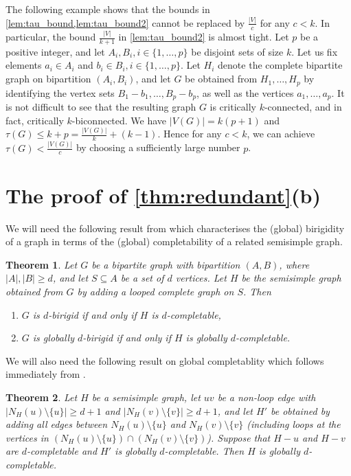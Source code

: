 \documentclass[11pt,a4paper,dvipsnames]{scrartcl}
\newtheorem{theorem}{Theorem}[section]
\begin{document}
The following example shows that the bounds in \cref{lem:tau_bound,lem:tau_bound2} cannot be replaced by $\frac{|V|}{c}$ for any $c < k$. In particular, the bound $\frac{|V|}{k+1}$ in \cref{lem:tau_bound2} is almost tight.
Let $p$ be a positive integer, and let $A_i,B_i, i \in\{1,\ldots,p\}$ be disjoint sets of size $k$. Let us fix elements $a_i \in A_i$ and $b_i \in B_i, i \in \{1,\ldots,p\}$. Let $H_i$ denote the complete bipartite graph on bipartition $(A_i,B_i)$, and let $G$ be obtained from $H_1,\ldots,H_p$ by identifying the vertex sets $B_1 - b_1,\ldots,B_p - b_p$, as well as the vertices $a_1,\ldots,a_p$. It is not difficult to see that the resulting graph $G$ is critically $k$-connected, and in fact, critically $k$-biconnected. We have $|V(G)|=k(p+1)$ and $\tau(G)\leq k+p=\frac{|V(G)|}{k}+(k-1)$. Hence for any $c < k$, we can achieve $\tau(G) < \frac{|V(G)|}{c}$ by choosing a sufficiently large number $p$.


\section{The proof of \texorpdfstring{\cref{thm:redundant}}{Lemma 1.5}(b)}\label{sec:red}


We will need the following result from \cite{JJT2} which characterises the (global) birigidity of a graph in terms of the (global) completability of a related semisimple graph.

\begin{theorem}\label{theorem:birigidtocompletable}\cite[Theorems 17 and 19]{JJT2}
    Let $G$ be a bipartite graph with bipartition $(A,B)$, where $|A|,|B| \geq d$, and let $S \subseteq A$ be a set of $d$ vertices. Let $H$ be the semisimple graph obtained from $G$ by adding a looped complete graph on $S$. Then
    \begin{enumerate}
        \item $G$ is $d$-birigid if and only if $H$ is $d$-completable, 
        \item $G$ is globally $d$-birigid if and only if $H$ is globally $d$-completable.
    \end{enumerate}
\end{theorem}

We will also need the following result on global completablity  which follows immediately from  \cite[Theorem 22]{JJT2}.

\begin{theorem}\label{theorem:globaltolocal}
    Let $H$ be a semisimple graph, let $uv$ be a non-loop edge with $|N_H(u) \setminus \{u\}| \geq d+1$ and $|N_H(v) \setminus \{v\}| \geq d+1$, and let $H'$ be obtained by adding all edges between $N_H(u) \setminus \{u\}$ and $N_H(v) \setminus \{v\}$ (including loops at the vertices in $(N_H(u) \setminus \{u\}) \cap (N_H(v) \setminus \{v\})$). Suppose that $H-u$ and $H-v$ are $d$-completable and $H'$ is globally $d$-completable. Then $H$ is globally $d$-completable.
\end{theorem}
\end{document}

